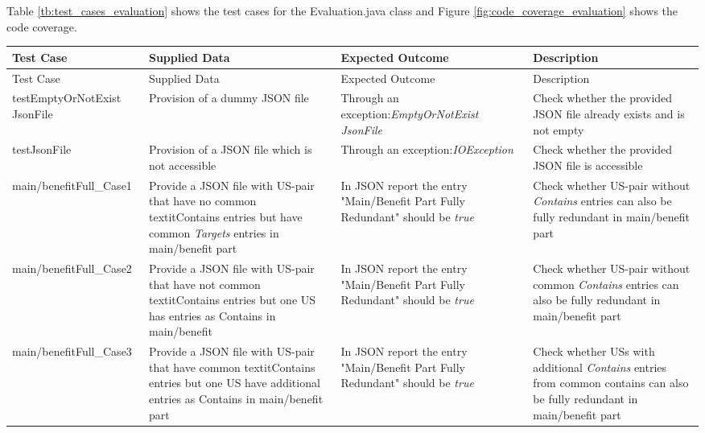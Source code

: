 Table \ref{tb:test_cases_evaluation} shows the test cases for the Evaluation.java class and Figure \ref{fig:code_coverage_evaluation} shows the code coverage.

\begingroup
\centering
\scriptsize
\renewcommand{\arraystretch}{1,5} 
\keepXColumns

\begin{tabularx}{\textwidth}{X  X  X  X}
	\hline
	Test Case &Supplied Data&Expected Outcome&Description\\
	\hline\hline
	\endfirsthead
	\hline
	Test Case &Supplied Data&Expected Outcome&Description\\
	\hline\hline
	\endhead
	
	testEmptyOrNotExist JsonFile&Provision of a dummy JSON file&Through an exception:\textit{EmptyOrNotExist JsonFile}&Check whether the provided JSON file already exists and is not empty\\
	
	testJsonFile&Provision of a JSON file which is not accessible&Through an exception:\textit{IOException}&Check whether the provided JSON file is accessible\\
	
	main/benefitFull\_Case1&Provide a JSON file with US-pair that have no common textit{Contains} entries but have common \textit{Targets} entries in main/benefit part&In JSON report the entry "Main/Benefit Part Fully Redundant" should be \textit{true}&Check whether US-pair without \textit{Contains} entries can also be fully redundant in main/benefit part\\
	
	main/benefitFull\_Case2&Provide a JSON file with US-pair that have not common textit{Contains} entries but one US has entries as Contains in main/benefit&In JSON report the entry "Main/Benefit Part Fully Redundant" should be \textit{true}&Check whether US-pair without common \textit{Contains} entries can also be fully redundant in main/benefit part\\
	
	main/benefitFull\_Case3&Provide a JSON file with US-pair that have common textit{Contains} entries but one US have additional entries as Contains in main/benefit part&In JSON report the entry "Main/Benefit Part Fully Redundant" should be \textit{true}&Check whether USs with additional \textit{Contains} entries from common contains can also be fully redundant in main/benefit part\\
		

\end{tabularx}

